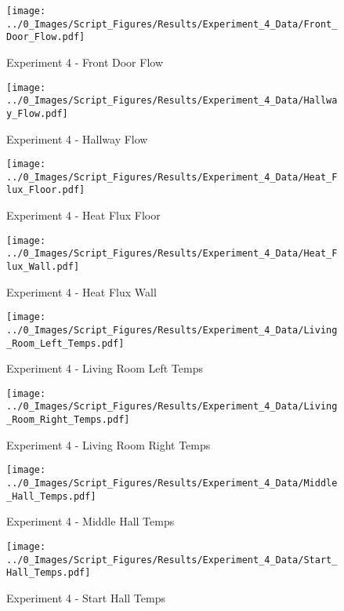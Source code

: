 	\clearpage

	\begin{figure}[H]
		\centering
		\texttt{[image: ../0\_Images/Script\_Figures/Results/Experiment\_4\_Data/Front\_Door\_Flow.pdf]}
		\caption[]{Experiment 4 - Front Door Flow}
	\end{figure}
 

	\begin{figure}[H]
		\centering
		\texttt{[image: ../0\_Images/Script\_Figures/Results/Experiment\_4\_Data/Hallway\_Flow.pdf]}
		\caption[]{Experiment 4 - Hallway Flow}
	\end{figure}
 
	\clearpage

	\begin{figure}[H]
		\centering
		\texttt{[image: ../0\_Images/Script\_Figures/Results/Experiment\_4\_Data/Heat\_Flux\_Floor.pdf]}
		\caption[]{Experiment 4 - Heat Flux Floor}
	\end{figure}
 

	\begin{figure}[H]
		\centering
		\texttt{[image: ../0\_Images/Script\_Figures/Results/Experiment\_4\_Data/Heat\_Flux\_Wall.pdf]}
		\caption[]{Experiment 4 - Heat Flux Wall}
	\end{figure}
 
	\clearpage

	\begin{figure}[H]
		\centering
		\texttt{[image: ../0\_Images/Script\_Figures/Results/Experiment\_4\_Data/Living\_Room\_Left\_Temps.pdf]}
		\caption[]{Experiment 4 - Living Room Left Temps}
	\end{figure}
 

	\begin{figure}[H]
		\centering
		\texttt{[image: ../0\_Images/Script\_Figures/Results/Experiment\_4\_Data/Living\_Room\_Right\_Temps.pdf]}
		\caption[]{Experiment 4 - Living Room Right Temps}
	\end{figure}
 
	\clearpage

	\begin{figure}[H]
		\centering
		\texttt{[image: ../0\_Images/Script\_Figures/Results/Experiment\_4\_Data/Middle\_Hall\_Temps.pdf]}
		\caption[]{Experiment 4 - Middle Hall Temps}
	\end{figure}
 

	\begin{figure}[H]
		\centering
		\texttt{[image: ../0\_Images/Script\_Figures/Results/Experiment\_4\_Data/Start\_Hall\_Temps.pdf]}
		\caption[]{Experiment 4 - Start Hall Temps}
	\end{figure}
 

